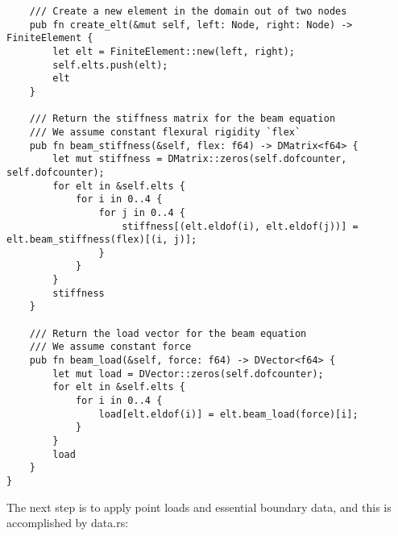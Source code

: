 \documentclass[10pt]{article}
\theoremstyle{definition}
\begin{document}
\begin{verbatim}
    /// Create a new element in the domain out of two nodes
    pub fn create_elt(&mut self, left: Node, right: Node) -> FiniteElement {
        let elt = FiniteElement::new(left, right);
        self.elts.push(elt);
        elt
    }

    /// Return the stiffness matrix for the beam equation
    /// We assume constant flexural rigidity `flex`
    pub fn beam_stiffness(&self, flex: f64) -> DMatrix<f64> {
        let mut stiffness = DMatrix::zeros(self.dofcounter, self.dofcounter);
        for elt in &self.elts {
            for i in 0..4 {
                for j in 0..4 {
                    stiffness[(elt.eldof(i), elt.eldof(j))] = elt.beam_stiffness(flex)[(i, j)];
                }
            }
        }
        stiffness
    }

    /// Return the load vector for the beam equation
    /// We assume constant force
    pub fn beam_load(&self, force: f64) -> DVector<f64> {
        let mut load = DVector::zeros(self.dofcounter);
        for elt in &self.elts {
            for i in 0..4 {
                load[elt.eldof(i)] = elt.beam_load(force)[i];
            }
        }
        load
    }
}
\end{verbatim}

The next step is to apply point loads and essential boundary data, and this is accomplished by data.rs:
\end{document}
